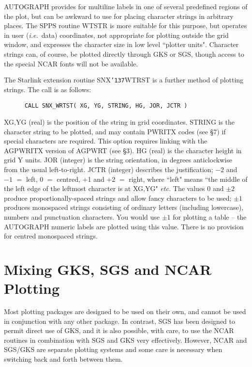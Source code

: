\documentclass[11pt]{article}
\renewcommand{\_}{{\tt\char'137}}     %
\begin{document}
AUTOGRAPH provides for multiline labels in one of several
predefined regions of the plot, but can be awkward to use for
placing character strings in arbitrary places.
The SPPS routine WTSTR is more suitable for this purpose, but
operates in user ({\em i.e.}\ data) coordinates, not appropriate for
plotting outside the grid window, and expresses the character
size in low level ``plotter units".
Character strings can, of course, be plotted directly
through GKS or SGS, though access to the special NCAR fonts
will not be available.

The Starlink extension routine SNX\_WTRST is a further method
of plotting strings.
The call is as follows:

\begin{verbatim}
      CALL SNX_WRTST( XG, YG, STRING, HG, JOR, JCTR )
\end{verbatim}

XG,YG (real) is the position of the string in grid coordinates.
STRING is the character string to be plotted, and may contain PWRITX codes
(see \S 7) if special characters are required.
This option requires linking with the AGPWRITX
version of AGPWRT (see \S 3).
HG (real) is the character height in grid Y units.
JOR (integer) is the string orientation, in degrees anticlockwise from
the usual left-to-right.
JCTR (integer) describes the justification; $-2$ and $-1$ $=$ left,
0 $=$ centred, +1 and +2 $=$ right, where ``left" means ``the middle of
the left edge of the leftmost character is at XG,YG" {\em etc.}
The values 0 and $\pm2$ produce proportionally-spaced strings and
allow fancy characters to be used;
$\pm1$ produces monospaced strings consisting of ordinary letters
(including lowercase), numbers and punctuation characters.
You would use $\pm1$ for plotting a table -- 
the AUTOGRAPH numeric labels are plotted using this value.
There is no provision for centred monospaced strings.


\section {Mixing GKS, SGS and NCAR Plotting}

Most plotting packages are designed to be used on their own,
and cannot be used in conjunction with any other package.
In contrast, SGS has been designed to permit direct use of
GKS, and it is also possible, with care, to use the NCAR routines
in combination with SGS and GKS very effectively.
However, NCAR and SGS/GKS are separate plotting systems and some
care is necessary when switching back and forth between them.
\end{document}

